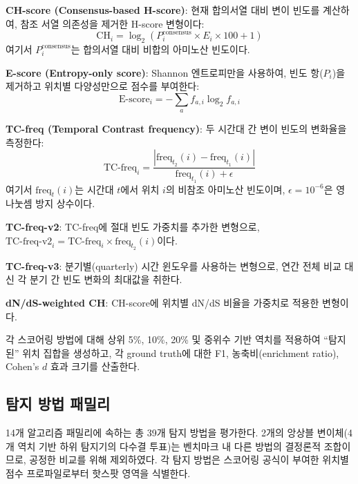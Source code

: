 \textbf{CH-score (Consensus-based H-score)}: 현재 합의서열 대비 변이 빈도를 계산하여, 참조 서열 의존성을 제거한 H-score 변형이다:
\begin{equation}
\text{CH}_i = \log_2(P_i^{\text{consensus}} \times E_i \times 100 + 1)
\end{equation}
여기서 $P_i^{\text{consensus}}$는 합의서열 대비 비합의 아미노산 빈도이다.

\textbf{E-score (Entropy-only score)}: Shannon 엔트로피만을 사용하여, 빈도 항($P_i$)을 제거하고 위치별 다양성만으로 점수를 부여한다:
\begin{equation}
\text{E-score}_i = -\sum_{a} f_{a,i} \log_2 f_{a,i}
\end{equation}

\textbf{TC-freq (Temporal Contrast frequency)}: 두 시간대 간 변이 빈도의 변화율을 측정한다:
\begin{equation}
\text{TC-freq}_i = \frac{|\text{freq}_{t_2}(i) - \text{freq}_{t_1}(i)|}{\text{freq}_{t_1}(i) + \epsilon}
\end{equation}
여기서 $\text{freq}_{t}(i)$는 시간대 $t$에서 위치 $i$의 비참조 아미노산 빈도이며, $\epsilon = 10^{-6}$은 영 나눗셈 방지 상수이다.

\textbf{TC-freq-v2}: TC-freq에 절대 빈도 가중치를 추가한 변형으로, $\text{TC-freq-v2}_i = \text{TC-freq}_i \times \text{freq}_{t_2}(i)$이다.

\textbf{TC-freq-v3}: 분기별(quarterly) 시간 윈도우를 사용하는 변형으로, 연간 전체 비교 대신 각 분기 간 빈도 변화의 최대값을 취한다.

\textbf{dN/dS-weighted CH}: CH-score에 위치별 dN/dS 비율을 가중치로 적용한 변형이다.

각 스코어링 방법에 대해 상위 5\%, 10\%, 20\% 및 중위수 기반 역치를 적용하여 ``탐지된'' 위치 집합을 생성하고, 각 ground truth에 대한 F1, 농축비(enrichment ratio), Cohen's $d$ 효과 크기를 산출한다.

\subsection{탐지 방법 패밀리}
\label{subsec:9pathogen_detection}

14개 알고리즘 패밀리에 속하는 총 39개 탐지 방법을 평가한다.
2개의 앙상블 변이체(4개 역치 기반 하위 탐지기의 다수결 투표)는 벤치마크 내 다른 방법의 결정론적 조합이므로, 공정한 비교를 위해 제외하였다.
각 탐지 방법은 스코어링 공식이 부여한 위치별 점수 프로파일로부터 핫스팟 영역을 식별한다.

